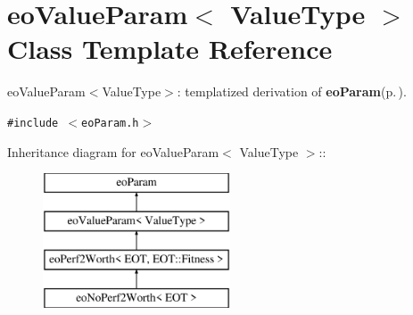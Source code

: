 \section{eo\-Value\-Param$<$ Value\-Type $>$ Class Template Reference}
\label{classeo_value_param}
eo\-Value\-Param$<$Value\-Type$>$: templatized derivation of {\bf eo\-Param}{\rm (p.\,\pageref{classeo_param})}.  


{\tt \#include $<$eo\-Param.h$>$}

Inheritance diagram for eo\-Value\-Param$<$ Value\-Type $>$::\begin{figure}[H]
\begin{center}
\leavevmode
\includegraphics[height=4cm]{classeo_value_param}
\end{center}
\end{figure}
